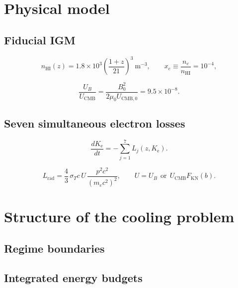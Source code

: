 \documentclass{aa}
\newcommand{\Ke}{K_{\mathrm{e}}}
\begin{document}
\section{Physical model}
\label{sec:model}

\subsection{Fiducial IGM}
\label{sec:igm}

\begin{equation}
   n_{\mathrm{HI}}(z) = 1.8\times10^{3}
   \left(\frac{1+z}{21}\right)^{3}\ \mathrm{m^{-3}},
   \qquad
   x_e \equiv \frac{n_e}{n_{\mathrm{HI}}} = 10^{-4} ,
   \label{eq:igm}
\end{equation}

\begin{equation}
   \frac{U_B}{U_{\mathrm{CMB}}}
   = \frac{B_0^{2}}{2\mu_0 U_{\mathrm{CMB},0}}
   = 9.5\times10^{-8} .
   \label{eq:ubucmb}
\end{equation}

\subsection{Seven simultaneous electron losses}
\label{sec:losses}

\begin{equation}
   \frac{d\Ke}{dt} = -\sum_{j=1}^{7} L_j(z,\Ke) .
   \label{eq:loss}
\end{equation}

\begin{equation}
   L_{\mathrm{rad}} = \frac{4}{3}\,\sigma_T c\,U\,
   \frac{p^{2}c^{2}}{(m_ec^{2})^{2}} ,
   \qquad
   U = U_B \ \ \mathrm{or}\ \ U_{\mathrm{CMB}}F_{\mathrm{KN}}(b) .
   \label{eq:rad}
\end{equation}


\section{Structure of the cooling problem}
\label{sec:structure}

\subsection{Regime boundaries}
\label{sec:bounds}

\subsection{Integrated energy budgets}
\label{sec:budgets}
\end{document}
